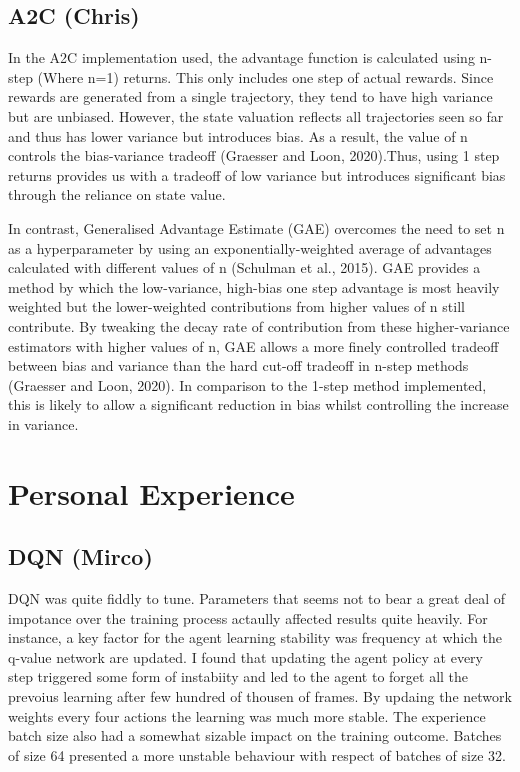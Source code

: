 \documentclass{article}
\begin{document}
\subsection{A2C (Chris)}

In the A2C implementation used, the advantage function is calculated using n-step (Where n=1) returns. This only includes one step of actual rewards. Since rewards are generated from a single trajectory, they tend to have high variance but are unbiased. However, the state valuation reflects all trajectories seen so far and thus has lower variance but introduces bias. As a result, the value of n controls the bias-variance tradeoff (Graesser and Loon, 2020).Thus, using 1 step returns provides us with a tradeoff of low variance but introduces significant bias through the reliance on state value.

In contrast, Generalised Advantage Estimate (GAE) overcomes the need to set n as a hyperparameter by using an exponentially-weighted average of advantages calculated with different values of n (Schulman et al., 2015). GAE provides a method by which the low-variance, high-bias one step advantage is most heavily weighted but the lower-weighted contributions from higher values of n still contribute. By tweaking the decay rate of contribution from these higher-variance estimators with higher values of n, GAE allows a more finely controlled tradeoff between bias and variance than the hard cut-off tradeoff in n-step methods (Graesser and Loon, 2020). In comparison to the 1-step method implemented, this is likely to allow a significant reduction in bias whilst controlling the increase in variance.

\section{Personal Experience}

\subsection{DQN (Mirco)}
DQN was quite fiddly to tune. Parameters that seems not to bear a great deal of impotance over the training process actaully affected results quite heavily. For instance, a key factor for the agent learning stability was frequency at which the q-value network are updated. I found that updating the agent policy at every step triggered some form of instabiity and led to the agent to forget all the prevoius learning after few hundred of thousen of frames. By updaing the network weights every four actions the learning was much more stable. The experience batch size also had a somewhat sizable impact on the training outcome. Batches of size 64 presented a more unstable behaviour with  respect of batches of size 32.  
\end{document}
